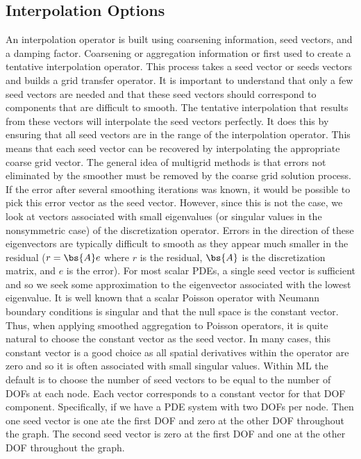 \subsection{Interpolation Options}
An interpolation operator is built using coarsening information, seed vectors,
and a damping factor. Coarsening or aggregation information or first used to
create a tentative interpolation operator. This process takes a seed vector or
seeds vectors and builds a grid transfer operator. It is important to
understand that only a few seed vectors are needed and that these seed vectors
should correspond to components that are difficult to smooth. The tentative
interpolation that results from these vectors will interpolate the seed
vectors perfectly. It does this by ensuring that all seed vectors are in the
range of the interpolation operator. This means that each seed vector can be
recovered by interpolating the appropriate coarse grid vector. The general
idea of multigrid methods is that errors not eliminated by the smoother must
be removed by the coarse grid solution process. If the error after several
smoothing iterations was known, it would be possible to pick this error vector
as the seed vector. However, since this is not the case, we look at vectors
associated with small eigenvalues (or singular values in the nonsymmetric
case) of the discretization operator. Errors in the direction of these
eigenvectors are typically difficult to smooth as they appear much smaller in
the residual ($r=\bs{A}e$ where $r$ is the residual, $\bs{A}$ is the
discretization matrix, and $e$ is the error). For most scalar PDEs, a single
seed vector is sufficient and so we seek some approximation to the eigenvector
associated with the lowest eigenvalue. It is well known that a scalar Poisson
operator with Neumann boundary conditions is singular and that the null space
is the constant vector. Thus, when applying smoothed aggregation to Poisson
operators, it is quite natural to choose the constant vector as the seed
vector. In many cases, this constant vector is a good choice as all spatial
derivatives within the operator are zero and so it is often associated with
small singular values. Within ML the default is to choose the number of seed
vectors to be equal to the number of DOFs at each node. Each vector
corresponds to a constant vector for that DOF component. Specifically, if we
have a PDE system with two DOFs per node. Then one seed vector is one ate the
first DOF and zero at the other DOF throughout the graph. The second seed
vector is zero at the first DOF and one at the other DOF throughout the graph.
